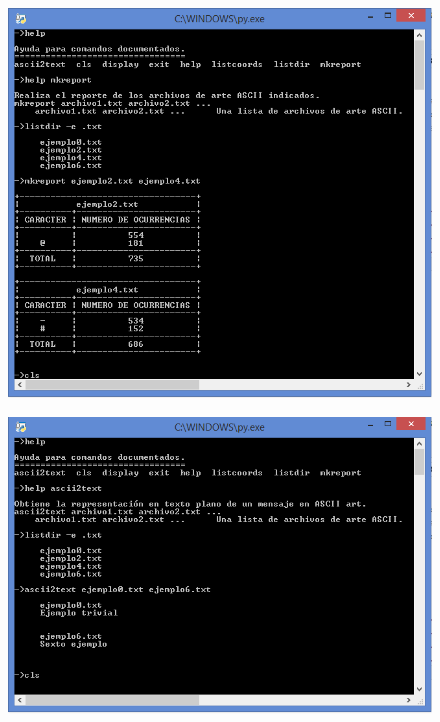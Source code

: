 \documentclass[a4paper,12pt]{article}
\begin{document}
\begin{figure}[h!]
    \centering
    \begin{adjustbox}{max width=\textwidth, center}
        \includegraphics{C4/S3_C4.PNG}
    \end{adjustbox}
\end{figure}
\begin{figure}[t!]
    \begin{adjustbox}{max width=\textwidth}
        \includegraphics{C4/S4_C4.PNG}
    \end{adjustbox}
\end{figure}
\end{document}
